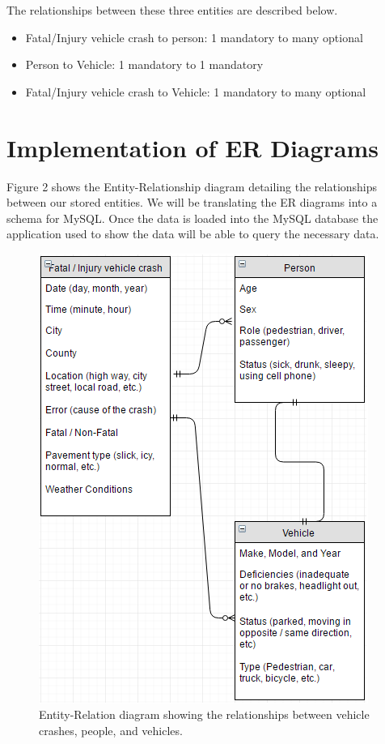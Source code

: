 \documentclass[journal]{vgtc}                %
\begin{document}
The relationships between these three entities are described below.
\begin{itemize}
  \item Fatal/Injury vehicle crash to person: 1 mandatory to many optional
  \item Person to Vehicle: 1 mandatory to 1 mandatory
  \item Fatal/Injury vehicle crash to Vehicle: 1 mandatory to many optional
\end{itemize}

\section{Implementation of ER Diagrams}

Figure 2 shows the Entity-Relationship diagram detailing the relationships between our stored entities.
We will be translating the ER diagrams into a schema for MySQL.
Once the data is loaded into the MySQL database the application used to show the data will be able to query the necessary data.

\begin{figure}[tb]
  \centering %
  \includegraphics[width=\columnwidth]{entityrelationship}
  \caption{Entity-Relation diagram showing the relationships between vehicle crashes, people, and vehicles.}
  \label{fig:sample}
\end{figure}
\end{document}
